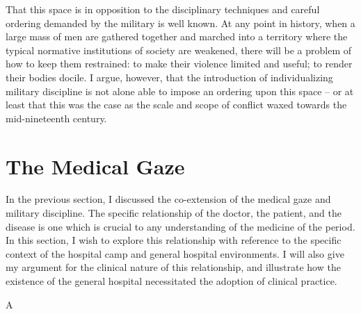 \documentclass{report}
\begin{document}
  That this space is in opposition to the disciplinary techniques and careful ordering demanded by the military is well known. At any point
  in history, when a large mass of men are gathered together and marched into a territory where the typical normative institutions
  of society are weakened, there will be a problem of how to keep them restrained: to make their violence limited and useful; to render their
  bodies docile. I argue, however, that the introduction of individualizing military discipline is not alone able to impose an ordering upon
  this space -- or at least that this was the case as the scale and scope of conflict waxed towards the mid-nineteenth century.

  \section{The Medical Gaze}\label{sec:the_medical_gaze} %

  In the previous section, I discussed the co-extension of the medical gaze and military discipline. The specific relationship of the doctor, the
  patient, and the disease is one which is crucial to any understanding of the medicine of the period. In this section, I wish to explore this relationship
  with reference to the specific context of the hospital camp and general hospital environments. I will also give my argument for the clinical nature of 
  this relationship, and illustrate how the existence of the general hospital necessitated the adoption of clinical practice.

  \vspace{12pt}
  A

  \newpage
  \printbibliography
 
  
\end{document}
